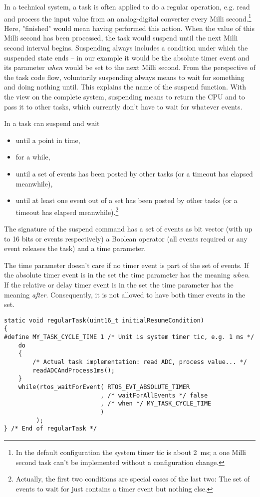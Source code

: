 In a technical system, a task is often applied to do a regular operation,
e.g. read and process the input value from an analog-digital converter
every Milli second.\footnote{In the \rtos{} default configuration the
system timer tic is about 2~ms; a one Milli second task can't be
implemented without a configuration change.} Here, "finished" would mean
having performed this action. When the value of this Milli second has been
processed, the task would suspend until the next Milli second interval
begins. Suspending always includes a condition under which the suspended
state ends -- in our example it would be the absolute timer event and its
parameter \emph{when} would be set to the next Milli second. From the
perspective of the task code flow, voluntarily suspending always means to
wait for something and doing nothing until. This explains the name of the
suspend function. With the view on the complete system, suspending means
to return the CPU and to pass it to other tasks, which currently don't
have to wait for whatever events.

In \rtos{} a task can suspend and wait
\begin{itemize}
  \item until a point in time,
  \item for a while,
  \item until a set of events has been posted by other tasks (or a timeout
    has elapsed meanwhile),
  \item until at least one event out of a set has been posted by other
    tasks (or a timeout has elapsed meanwhile).\footnote{Actually, the
    first two conditions are special cases of the last two: The set of
    events to wait for just contains a timer event but nothing else.}
\end{itemize}

The signature of the suspend command has a set of events as bit vector
(with up to 16 bits or events respectively) a Boolean operator (all events
required or any event releases the task) and a time parameter.

The time parameter doesn't care if no timer event is part of the set of
events. If the absolute timer event is in the set the time parameter has
the meaning \emph{when}. If the relative or delay timer event is in the
set the time parameter has the meaning \emph{after}. Consequently, it is
not allowed to have both timer events in the set.

\begin{lstlisting}[float, caption=Typical use case: regular task,
label=lstRegularTask, captionpos=b]
static void regularTask(uint16_t initialResumeCondition)
{
#define MY_TASK_CYCLE_TIME 1 /* Unit is system timer tic, e.g. 1 ms */
    do
    {
        /* Actual task implementation: read ADC, process value... */
        readADCAndProcess1ms();
    }
    while(rtos_waitForEvent( RTOS_EVT_ABSOLUTE_TIMER
                           , /* waitForAllEvents */ false
                           , /* when */ MY_TASK_CYCLE_TIME
                           )
         );
} /* End of regularTask */
\end{lstlisting}

